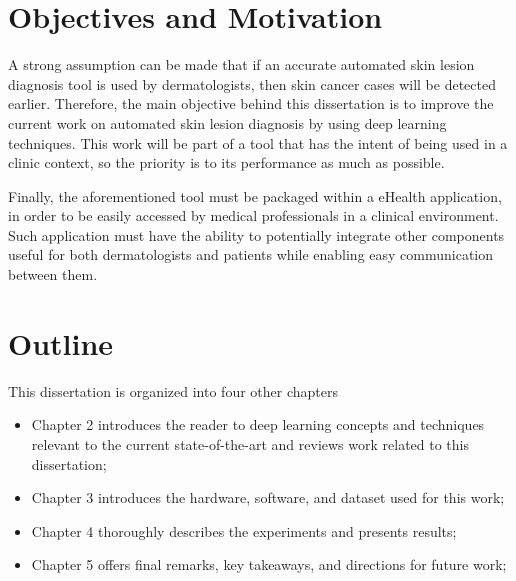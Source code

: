 \section{Objectives and Motivation}
    A strong assumption can be made that if an accurate automated skin lesion diagnosis tool is used by dermatologists, then skin cancer cases will be detected earlier. Therefore, the main objective behind this dissertation is to improve the current work on automated skin lesion diagnosis by using deep learning techniques. This work will be part of a tool that has the intent of being used in a clinic context, so the priority is to its performance as much as possible. \par 
    Finally, the aforementioned tool must be packaged within a eHealth application, in order to be easily accessed by medical professionals in a clinical environment. Such application must have the ability to potentially integrate other components useful for both dermatologists and patients while enabling easy communication between them. 


\section{Outline}
    This dissertation is organized into four other chapters
    \begin{itemize}
        \item Chapter 2 introduces the reader to deep learning concepts and techniques relevant to the current state-of-the-art and reviews work related to this dissertation;
        \item Chapter 3 introduces the hardware, software, and dataset used for this work; 
        \item Chapter 4 thoroughly describes the experiments and presents results;  \item Chapter 5 offers final remarks, key takeaways, and directions for future work;
    \end{itemize}